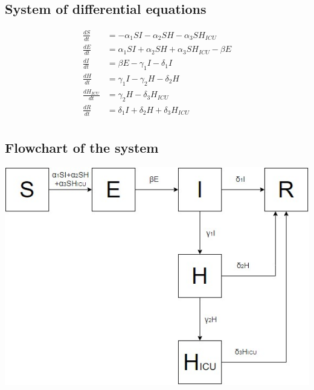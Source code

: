 \documentclass[11pt]{article}
\begin{document}
\subsection{System of differential equations}
\begin{equation}
\begin{aligned}
\frac{dS}{dt}&=- \alpha_1 SI - \alpha_2 SH - \alpha_3 SH_{ICU} \\
\frac{dE}{dt}&= \alpha_1 SI + \alpha_2 SH + \alpha_3 SH_{ICU} - \beta E \\
\frac{dI}{dt}&= \beta E -\gamma_1 I -\delta_1 I \\
\frac{dH}{dt}&= \gamma_1 I - \gamma_2 H -\delta_2 H \\
\frac{dH_{ICU}}{dt}&= \gamma_2 H -\delta_3 H_{ICU} \\
\frac{dR}{dt}&=\delta_1 I + \delta_2 H + \delta_3 H_{ICU} \\
\end{aligned}
\end{equation} 
\subsection{Flowchart of the system}
\begin{center}
\includegraphics[width=1\textwidth]{SEIHR.jpg} 
\end{center}
\end{document}
